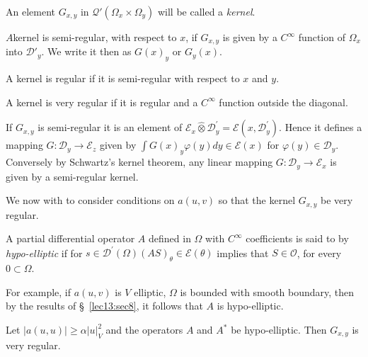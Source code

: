 \begin{definition}\label{lec23:sec12:subsec1:def12.1} %
  An element $G_{x, y} $ in $\mathscr{Q}' (\Omega_x \times \Omega_y)$
  will be called a {\em kernel}.  
\end{definition}

\begin{definition}\label{lec23:sec12:subsec1:def12.2} %
  $A$\pageoriginale kernel is semi-regular, with respect to $x$, if $G_{x, y}$ is given
  by a $C^\infty$ function of $\Omega_x$ into $\mathscr{D}'_y$. We write
  it then as $G(x)_y$ or $G_y(x)$. 
\end{definition}

\begin{definition}\label{lec23:sec12:subsec1:def12.3}%
  A kernel is regular if it is semi-regular with respect to $x$ and $y$.
\end{definition}

\begin{definition}\label{lec23:sec12:subsec1:def12.4}%
  A kernel is very regular if it is regular and a $C^\infty$ function
  outside the diagonal. 
\end{definition}

If $G_{x, y}$ is semi-regular it is an element of $\mathscr{E}_x
\hat{\otimes} \mathscr{D}^{'}_{y} = \mathscr{E} (x,
\mathscr{D}^{'}_{y})$. Hence it defines a mapping $G : \mathscr{D}_y
\to \mathscr{E}_z$ given by $\int G(x)_y \varphi (y) dy \in
\mathscr{E}(x)$ for $\varphi (y) \in \mathscr{D}_y$. Conversely
by Schwartz's kernel theorem, any linear mapping $G : \mathscr{D}_y
\to \mathscr{E}_x$ is given by a semi-regular kernel. 

We now with to consider conditions on $a(u, v)$ so that the kernel
$G_{x, y}$ be very regular.
 
\begin{definition}\label{lec23:sec12:subsec1:def12.5}%
  A partial differential operator $A$ defined in $\Omega$ with
  $C^\infty$ coefficients is said to by {\em hypo-elliptic} if for $s
  \in \mathscr{D}^{'} (\Omega)(AS)_{\theta} \in
  \mathscr{E}(\theta)$ implies that $S \in \mathscr{O}$,
  for every $0 \subset \Omega$. 
\end{definition}

For example, if $a(u, v)$ is $V$ elliptic, $\Omega$ is bounded with
smooth boundary, then by the results of \S\ \ref{lec13:sec8}, it follows that $A$ is hypo-elliptic. 

\begin{theorem}\label{lec23:sec12:subsec1:thm12.1}%
  Let $|a (u, u)| \ge \alpha |u |^2_V$ and the operators $A$ and $A^*$
  be hypo-elliptic. Then $G_{x, y}$ is very regular. 
\end{theorem}

